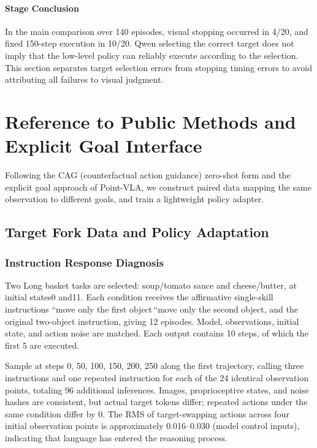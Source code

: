 
\paragraph{Stage Conclusion} In the main comparison over 140 episodes, visual stopping occurred in 4/20, and fixed 150-step execution in 10/20. Qwen selecting the correct target does not imply that the low-level policy can reliably execute according to the selection. This section separates target selection errors from stopping timing errors to avoid attributing all failures to visual judgment.


\FloatBarrier

\section{Reference to Public Methods and Explicit Goal Interface}

\label{stage:s14}

Following the CAG (counterfactual action guidance) zero-shot form and the explicit goal approach of Point-VLA, we construct paired data mapping the same observation to different goals, and train a lightweight policy adapter.

\subsection{Target Fork Data and Policy Adaptation}\label{s14-detail-1}

\subsubsection{Instruction Response Diagnosis}\label{s14-detail-2}

Two Long basket tasks are selected: soup/tomato sauce and cheese/butter, at initial states0 and11. Each condition receives the affirmative single-skill instructions ``move only the first object\,``move only the second object, and the original two-object instruction, giving 12 episodes. Model, observations, initial state, and action noise are matched. Each output contains 10 steps, of which the first 5 are executed.

Sample at steps 0, 50, 100, 150, 200, 250 along the first trajectory, calling three instructions and one repeated instruction for each of the 24 identical observation points, totaling 96 additional inferences. Images, proprioceptive states, and noise hashes are consistent, but actual target tokens differ; repeated actions under the same condition differ by 0. The RMS of target-swapping actions across four initial observation points is approximately 0.016--0.030 (model control inputs), indicating that language has entered the reasoning process.

